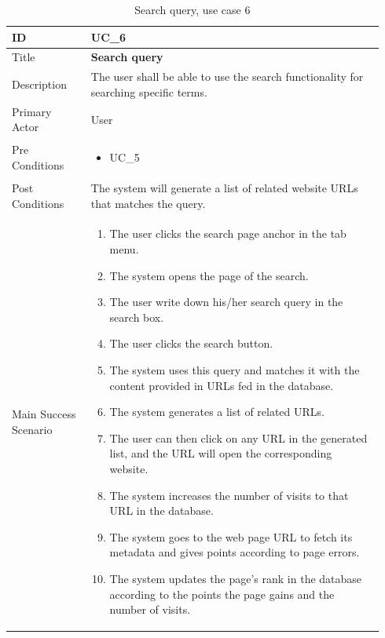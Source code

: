 \documentclass{scrartcl}
\begin{document}
\begin{table}[H]
  \caption{Search query, use case 6}
  \begin{tabular}{p{0.20\linewidth} | p{0.74\linewidth}}
    \toprule
    ID & UC\_6
    \\\midrule
    Title & \textbf{Search query}
    \\\hline
    Description & The user shall be able to use the search functionality for searching specific terms.
    \\\hline
    Primary Actor & User
    \\\hline
    Pre Conditions & {
                     \begin{itemize}
                     \item UC\_5
                     \end{itemize}
                     }\vspace*{-\baselineskip}
    \\\hline
    Post Conditions & The system will generate a list of related website URLs that matches the query.
    \\\hline
    Main Success Scenario & {
                            \begin{enumerate}
                            \item The user clicks the search page anchor in the tab menu.
                            \item The system opens the page of the search.
                            \item The user write down his/her search query in the search box.
                            \item The user clicks the search button.
                            \item The system uses this query and matches it with the content provided in URLs fed in the database.
                            \item The system generates a list of related URLs.
                            \item The user can then click on any URL in the generated list, and the URL will open the corresponding website.
                            \item The system increases the number of visits to that URL in the database.
                            \item The system goes to the web page URL to fetch its metadata and gives points according to page errors.
                            \item The system updates the page's rank in the database according to the points the page gains and the number of visits.
                            \end{enumerate}
                            }\vspace*{-\baselineskip}
    \\\bottomrule
  \end{tabular}
\end{table}
\end{document}
